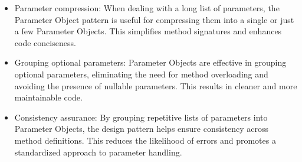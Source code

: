 \begin{itemize}
    \item Parameter compression:
    When dealing with a long list of parameters, the Parameter Object pattern is useful for compressing them into
    a single or just a few Parameter Objects.
    This simplifies method signatures and enhances code conciseness.
    \item Grouping optional parameters:
    Parameter Objects are effective in grouping optional parameters, eliminating the need for method overloading
    and avoiding the presence of nullable parameters.
    This results in cleaner and more maintainable code.
    \item Consistency assurance:
    By grouping repetitive lists of parameters into Parameter Objects, the design pattern helps ensure consistency
    across method definitions.
    This reduces the likelihood of errors and promotes a standardized approach to parameter handling.
\end{itemize}
